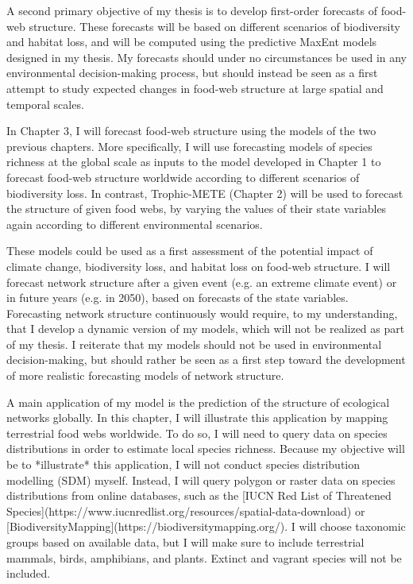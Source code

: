 A second primary objective of my thesis is to develop first-order forecasts of
food-web structure. These forecasts will be based on different scenarios of
biodiversity and habitat loss, and will be computed using the predictive MaxEnt
models designed in my thesis. My forecasts should under no circumstances be used
in any environmental decision-making process, but should instead be seen as a
first attempt to study expected changes in food-web structure at large spatial
and temporal scales.

In Chapter 3, I will forecast food-web structure using the models of the two
previous chapters. More specifically, I will use forecasting models of species
richness at the global scale as inputs to the model developed in Chapter 1 to
forecast food-web structure worldwide according to different scenarios of
biodiversity loss. In contrast, Trophic-METE (Chapter 2) will be used to
forecast the structure of given food webs, by varying the values of their state
variables again according to different environmental scenarios.

These models could be used as a first assessment of the potential impact of
climate change, biodiversity loss, and habitat loss on food-web structure. I
will forecast network structure after a given event (e.g. an extreme climate
event) or in future years (e.g. in 2050), based on forecasts of the state
variables. Forecasting network structure continuously would require, to my
understanding, that I develop a dynamic version of my models, which will not be
realized as part of my thesis. I reiterate that my models should not be used in
environmental decision-making, but should rather be seen as a first step toward
the development of more realistic forecasting models of network structure.

A main application of my model is the prediction of the structure of ecological
networks globally. In this chapter, I will illustrate this application by
mapping terrestrial food webs worldwide. To do so, I will need to query data on
species distributions in order to estimate local species richness. Because my
objective will be to *illustrate* this application, I will not conduct species
distribution modelling (SDM) myself. Instead, I will query polygon or raster
data on species distributions from online databases, such as the [IUCN Red List
of Threatened
Species](https://www.iucnredlist.org/resources/spatial-data-download) or
[BiodiversityMapping](https://biodiversitymapping.org/). I will choose taxonomic
groups based on available data, but I will make sure to include terrestrial
mammals, birds, amphibians, and plants. Extinct and vagrant species will not be
included.

